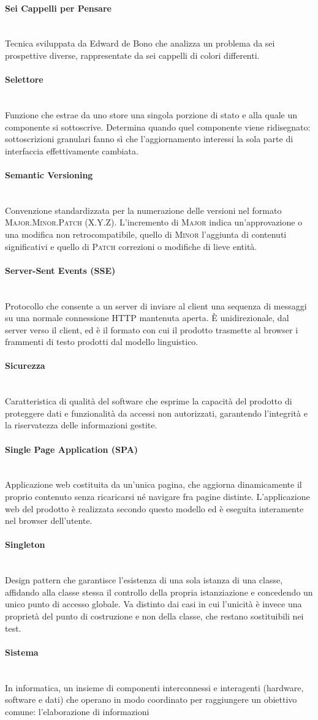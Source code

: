 \documentclass[a4paper, 10pt, colorlinks=true, linkcolor=black, urlcolor=blue, citecolor=blue, hidelinks]{article}
\newcommand{\glossaryterm}[2]{
    \paragraph{#1 \label{term:#1}} \mbox{} \\
    #2
    \vspace{0.5em}
}
\begin{document}
\glossaryterm{Sei Cappelli per Pensare}{Tecnica sviluppata da Edward de Bono che analizza un problema da sei prospettive diverse, rappresentate da sei cappelli di colori differenti.}

\glossaryterm{Selettore}{Funzione che estrae da uno store una singola porzione di stato e alla quale un componente si sottoscrive. Determina quando quel componente viene ridisegnato: sottoscrizioni granulari fanno sì che l'aggiornamento interessi la sola parte di interfaccia effettivamente cambiata.}

\glossaryterm{Semantic Versioning}{Convenzione standardizzata per la numerazione delle versioni nel formato \textsc{Major.Minor.Patch} (\textsc{X.Y.Z}). L'incremento di \textsc{Major} indica un'approvazione o una modifica non retrocompatibile, quello di \textsc{Minor} l'aggiunta di contenuti significativi e quello di \textsc{Patch} correzioni o modifiche di lieve entità.}

\glossaryterm{Server-Sent Events (SSE)}{Protocollo che consente a un server di inviare al client una sequenza di messaggi su una normale connessione HTTP mantenuta aperta. È unidirezionale, dal server verso il client, ed è il formato con cui il prodotto trasmette al browser i frammenti di testo prodotti dal modello linguistico.}

\glossaryterm{Sicurezza}{Caratteristica di qualità del software che esprime la capacità del prodotto di proteggere dati e funzionalità da accessi non autorizzati, garantendo l'integrità e la riservatezza delle informazioni gestite.}

\glossaryterm{Single Page Application (SPA)}{Applicazione web costituita da un'unica pagina, che aggiorna dinamicamente il proprio contenuto senza ricaricarsi né navigare fra pagine distinte. L'applicazione web del prodotto è realizzata secondo questo modello ed è eseguita interamente nel browser dell'utente.}

\glossaryterm{Singleton}{Design pattern che garantisce l'esistenza di una sola istanza di una classe, affidando alla classe stessa il controllo della propria istanziazione e concedendo un unico punto di accesso globale. Va distinto dai casi in cui l'unicità è invece una proprietà del punto di costruzione e non della classe, che restano sostituibili nei test.}

\glossaryterm{Sistema}{In informatica, un insieme di componenti interconnessi e interagenti (hardware, software e dati) che operano in modo coordinato per raggiungere un obiettivo comune: l'elaborazione di informazioni}
\end{document}
